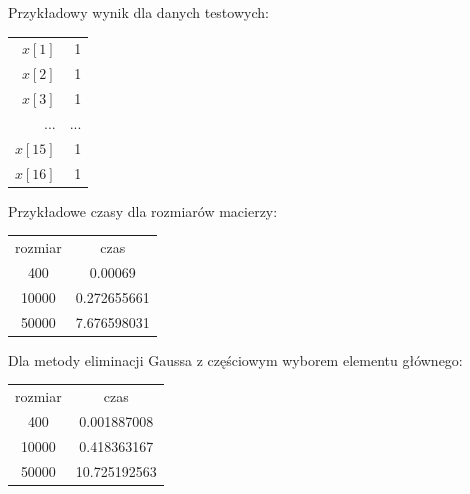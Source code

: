 \documentclass{article}
\begin{document}
	Przykładowy wynik dla danych testowych:\newline
		\begin{center}
			\begin{tabular}{|r|r|}
				$x[1]$ & 1	\\
				$x[2]$ & 1	\\
				$x[3]$ & 1	\\
				... & ... \\
				$x[15]$ & 1	\\
				$x[16]$ & 1	\\
			\end{tabular}
		\end{center}
	Przykładowe czasy dla rozmiarów macierzy:
	\begin{center}
		\begin{tabular}{|c|c|}
			rozmiar & czas \\
			400 & 0.00069\\
			10000 & 0.272655661\\
			50000 & 7.676598031\\
		\end{tabular}
	\end{center}
	Dla metody eliminacji Gaussa z częściowym wyborem elementu głównego:
	\begin{center}
	\begin{tabular}{|c|c|}
		rozmiar & czas \\
		400 & 0.001887008\\
		10000 & 0.418363167\\
		50000 & 10.725192563\\
	\end{tabular}
\end{center}	
\end{document}
